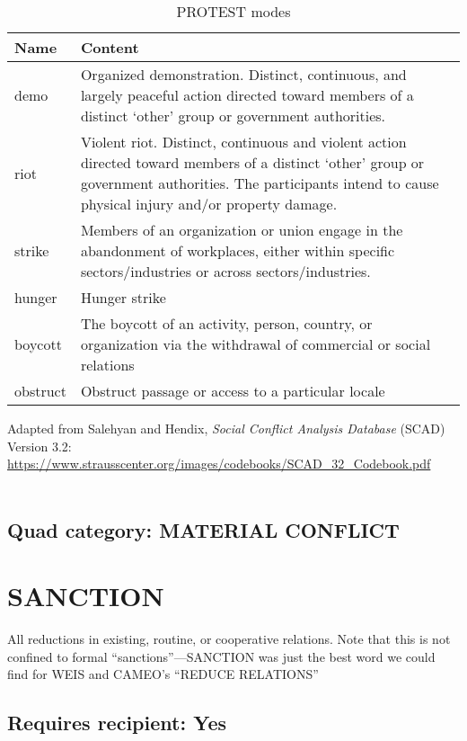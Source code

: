 \documentclass[11pt]{report}
\newcommand{\plcat}[1]{\textsf{#1}}
\begin{document}
\begin{table}[htp]
\caption{PROTEST modes}
\begin{center}
\begin{tabular}{|l|p{13cm}|}
\hline
Name & Content \\
\hline
demo & Organized demonstration. Distinct, continuous, and largely peaceful action directed toward
members of a distinct `other' group or government authorities.  \\
riot & Violent riot. Distinct, continuous and violent action directed toward members of
a distinct `other' group or government authorities. The participants intend to cause physical injury and/or property damage. \\
strike & Members of an organization or union engage in the abandonment of
workplaces, either within specific sectors/industries or across sectors/industries.\\
hunger & Hunger strike\\
boycott & The boycott of an activity, person, country, or organization via the withdrawal of commercial or social relations\\
obstruct & Obstruct passage or access to a particular locale \\
\hline
\end{tabular}
\end{center}
\label{tab:protestmode}
\raggedright{Adapted from Salehyan and Hendix, \textit{Social Conflict Analysis Database} (SCAD)
Version 3.2: \url{https://www.strausscenter.org/images/codebooks/SCAD\_32\_Codebook.pdf}}\\~

\end{table}%

\subsection{Quad category: MATERIAL CONFLICT}

\newpage

\section{SANCTION}

All reductions in existing, routine, or cooperative relations. Note that this is not confined to formal ``sanctions''---\plcat{SANCTION} was just the best word we could find for WEIS and CAMEO's ``REDUCE RELATIONS''


\subsection{Requires recipient: Yes}
\end{document}
